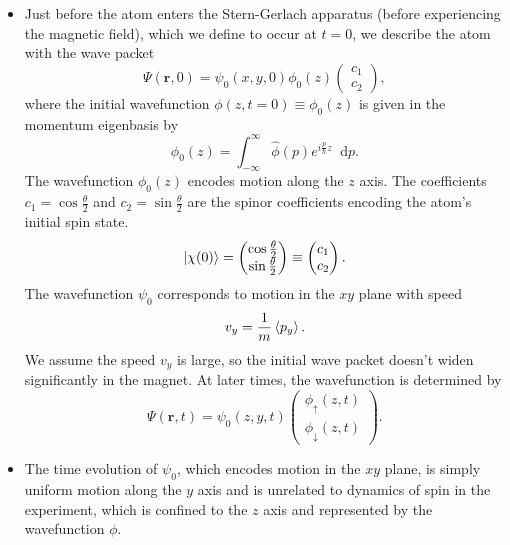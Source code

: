 \documentclass[11pt, a4paper]{article}
\newcommand{\diff}{\mathop{}\!\mathrm{d}} %
\newcommand{\SG}{Stern-Gerlach\xspace}
\renewcommand{\vec}[1]{\bm{#1}}  %
\newcommand{\F}[1]{\widehat{#1}} %
\newcommand{\ua}{\uparrow}  %
\newcommand{\da}{\downarrow}  %
\renewcommand{\r}{\vec{r}}  %
\begin{document}
\begin{itemize}
    \item Just before the atom enters the \SG apparatus (before experiencing the magnetic field), which we define to occur at $ t = 0 $, we describe the atom with the wave packet
    \begin{equation*}
        \Psi(\r, 0) = \psi_{0}(x, y, 0) \phi_{0}(z)
        \begin{pmatrix}
            c_{1}\\
            c_{2}
        \end{pmatrix},
    \end{equation*}
    where the initial wavefunction $ \phi(z, t = 0) \equiv \phi_{0}(z) $ is given in the momentum eigenbasis by
    \begin{equation*}
        \phi_{0}(z) = \int_{-\infty}^{\infty}\F{\phi}(p)e^{i \frac{p}{\hbar}z}\diff p.
    \end{equation*}
    The wavefunction $ \phi_{0}(z) $ encodes motion along the $ z $ axis. The coefficients $ c_{1} = \cos \frac{\theta}{2} $ and $ c_{2} = \sin \frac{\theta}{2} $ are the spinor coefficients encoding the atom's initial spin state.
    \begin{equation*}
        \ket{\chi(0)} = 
        \begin{pmatrix}
            \cos \frac{\theta}{2}\\
            \sin \frac{\theta}{2}
        \end{pmatrix}
        \equiv
        \begin{pmatrix}
            c_{1}\\
            c_{2}
        \end{pmatrix}.
    \end{equation*}
    The wavefunction $ \psi_{0} $ corresponds to motion in the $ xy $ plane with speed
    \begin{equation*}
        v_{y} = \frac{1}{m}\ev{p_{y}}.
    \end{equation*}
    We assume the speed $ v_{y} $ is large, so the initial wave packet doesn't widen significantly in the magnet. At later times, the wavefunction is determined by
    \begin{equation*}
        \Psi(\r, t) = \psi_{0}(z, y, t)
        \begin{pmatrix}
            \phi_{\ua}(z, t)\\
            \phi_{\da}(z, t)
        \end{pmatrix}.
    \end{equation*}
    
    \item The time evolution of $ \psi_{0} $, which encodes motion in the $ xy $ plane, is simply uniform motion along the $ y $ axis and is unrelated to dynamics of spin in the experiment, which is confined to the $ z $ axis and represented by the wavefunction $ \phi $.


\end{itemize}
\end{document}
